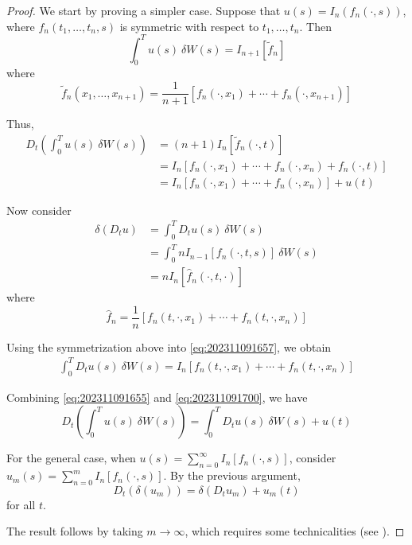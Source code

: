\begin{proof}
	We start by proving a simpler case. Suppose that $u(s) = I_n(f_n(\cdot, s))$, where $f_n(t_1, \ldots, t_n, s)$ is symmetric with respect to $t_1, \ldots, t_n$. Then 
	$$
	\int_0^T u(s) ~\delta W(s) = I_{n+1}[\tilde{f}_n]
	$$
	where 
	$$
	\tilde{f}_n(x_1, \ldots, x_{n+1}) = \frac{1}{n+1} \left[ f_n(\cdot, x_1) + \cdots + f_n(\cdot, x_{n+1}) \right]
	$$

	Thus,
	\begin{equation}\label{eq:202311091655}
	\begin{aligned}
		D_t \left( \int_0^T u(s) ~\delta W(s) \right) &= (n+1) I_n[\tilde{f}_n (\cdot, t)] \\
							      &= I_n \left[ f_n(\cdot, x_1) + \cdots + f_n(\cdot, x_n) + f_n(\cdot, t) \right] \\
							      &= I_n \left[ f_n(\cdot, x_1) + \cdots + f_n(\cdot, x_n) \right] + u(t)
	\end{aligned}
	\end{equation}

	Now consider 
	\begin{equation}\label{eq:202311091657}
	\begin{aligned}
	\delta(D_t u) &= \int_0^T D_t u(s) ~\delta W(s) \\
		      &= \int_0^T n I_{n-1}[f_n(\cdot, t, s)]~\delta W(s) \\
		      &= n I_n[\hat{f}_n(\cdot, t, \cdot)]
	\end{aligned}
	\end{equation}
	where
	$$
	\hat{f}_n = \frac{1}{n} \left[ f_n(t, \cdot, x_1) + \cdots + f_n(t, \cdot, x_n) \right]
	$$

	Using the symmetrization above into \eqref{eq:202311091657}, we obtain
	\begin{equation}\label{eq:202311091700}
	\begin{aligned}
	\int_0^T D_t u(s) ~\delta W(s) = I_n \left[ f_n(t, \cdot, x_1) + \cdots + f_n(t, \cdot, x_n) \right] 
	\end{aligned}
	\end{equation}

	Combining \eqref{eq:202311091655} and \eqref{eq:202311091700}, we have
	$$
	D_t \left( \int_0^T u(s) ~\delta W(s) \right) = \int_0^T D_t u(s) ~\delta W(s) + u(t) 
	$$

	For the general case, when $u(s) = \sum_{n=0}^\infty I_n[f_n(\cdot, s)]$, consider $u_m(s) = \sum_{n=0}^m I_n[f_n(\cdot, s)]$. By the previous argument, 
	$$
	D_t(\delta(u_m)) = \delta(D_t u_m) + u_m(t)
	$$
	for all $t$.

	The result follows by taking $m \to \infty$, which requires some technicalities (see \cite{nunno2008malliavin}).
\end{proof}

